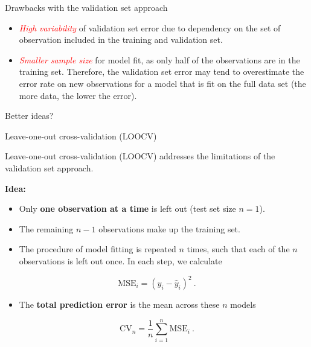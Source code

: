 \documentclass[
  10pt,
  ignorenonframetext,
]{beamer}
\providecommand{\tightlist}{%
  \setlength{\itemsep}{0pt}\setlength{\parskip}{0pt}}
\begin{document}
\begin{frame}
\begin{block}{Drawbacks with the validation set approach}
\protect\hypertarget{drawbacks-with-the-validation-set-approach}{}
\vspace{2mm}

\begin{itemize}
\tightlist
\item
  \emph{\textcolor{red}{High variability}} of validation set error due
  to dependency on the set of observation included in the training and
  validation set.
\end{itemize}

\vspace{2mm}

\begin{itemize}
\tightlist
\item
  \emph{\textcolor{red}{Smaller sample size}} for model fit, as only
  half of the observations are in the training set. Therefore, the
  validation set error may tend to overestimate the error rate on new
  observations for a model that is fit on the full data set (the more
  data, the lower the error).
\end{itemize}
\end{block}
\end{frame}

\begin{frame}
Better ideas?
\end{frame}

\begin{frame}
\begin{block}{Leave-one-out cross-validation (LOOCV)}
\protect\hypertarget{leave-one-out-cross-validation-loocv}{}
\(~\)

Leave-one-out cross-validation (LOOCV) addresses the limitations of the
validation set approach.

\vspace{4mm}

\textbf{Idea:}

\begin{itemize}
\tightlist
\item
  Only \textbf{one observation at a time} is left out (test set size
  \(n=1\)).
\item
  The remaining \(n-1\) observations make up the training set.
\item
  The procedure of model fitting is repeated \(n\) times, such that each
  of the \(n\) observations is left out once. In each step, we calculate
\end{itemize}

\[\text{MSE}_i=(y_i-\hat{y}_i)^2 \ .\]

\begin{itemize}
\tightlist
\item
  The \textbf{total prediction error} is the mean across these \(n\)
  models
\end{itemize}

\[\text{CV}_{n}=\frac{1}{n}\sum_{i=1}^n \text{MSE}_i \ .\]
\end{block}
\end{frame}
\end{document}
